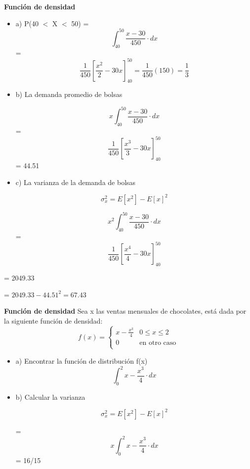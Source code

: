 \documentclass{../oxmathproblems}
\begin{document}
\begin{questions}
\begin{itemize}
\end{itemize}

\miquestion\textbf{Función de densidad}
\begin{itemize}
\item  a) 
 P(40 $<$ X $<$ 50) = 
\begin{equation}
 \int_{40}^{50} \frac{x-30}{450} \cdot dx
\end{equation} 
= $$ \frac{1}{450} [\frac{x^2}{2}-30x]^{50}_{40} = \frac{1}{450}(150) = \frac{1}{3} $$ 

\item  b) La demanda promedio de bolsas 

\begin{equation}
 x \int_{40}^{50} \frac{x-30}{450} \cdot dx
\end{equation} 
= $$ \frac{1}{450} [\frac{x^3}{3}-30x]^{50}_{40} $$ = 44.51


\item  c) La varianza de la demanda de bolsas

$$ \sigma_x^2 = E[x^2]-E[x]^2 $$ 

\begin{equation}
x^2 \int_{40}^{50} \frac{x-30}{450} \cdot dx
\end{equation} 
= $$ \frac{1}{450} [\frac{x^4}{4}-30x]^{50}_{40} $$
\end{itemize} 
= 2049.33

= $ 2049.33 - 44.51^2 = 67.43$ 


\miquestion \textbf{Función de densidad} Sea x las ventas mensuales de chocolates, está dada por la siguiente función de densidad: 
\[ 
f(x) = 
     \begin{cases}
       x- \frac{x^3}{4}  & 0  \leq x  \leq 2 \\
       0 & \text{en otro caso} \\
     \end{cases}
\]
$$$$
\begin{itemize}
\item  a) Encontrar la función de distribución f(x) 
\begin{equation}
 \int_{0}^{2} x- \frac{x^3}{4} \cdot dx
\end{equation} 


\item  b) Calcular la varianza

$$ \sigma_x^2 = E[x^2]-E[x]^2 $$ 

= \begin{equation}
 x \int_{0}^{2} x- \frac{x^3}{4} \cdot dx
\end{equation}
= 16/15


\end{itemize}
\end{questions}
\end{document}
